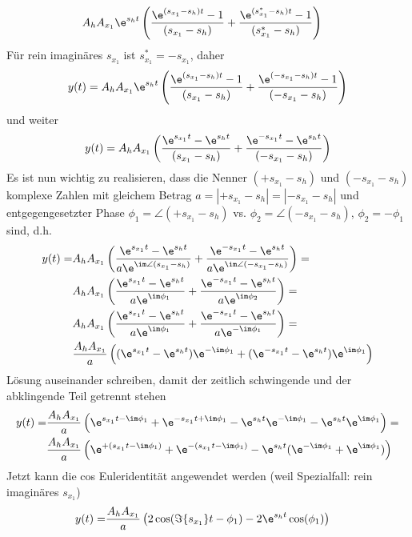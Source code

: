 \begin{ExCalc}
\begin{align}
&A_h A_{x_{1}} \e^{s_h t}  \left(\frac{\e^{(s_{x_{1}}-s_h) t}-1}{(s_{x_{1}}-s_h)}+\frac{\e^{(s^*_{x_{1}}-s_h) t}-1}{(s^*_{x_{1}}-s_h)}\right)
\end{align}
Für rein imaginäres $s_{x_{1}}$ ist $s^*_{x_{1}} = -s_{x_{1}}$, daher
\begin{align}
y(t) = A_h A_{x_{1}} \e^{s_h t}  \left(\frac{\e^{(s_{x_{1}}-s_h) t}-1}{(s_{x_{1}}-s_h)}+\frac{\e^{(-s_{x_{1}}-s_h) t}-1}{(-s_{x_{1}}-s_h)}\right)
\end{align}
und weiter
\begin{align}
y(t) = A_h A_{x_{1}} \left(\frac{\e^{s_{x_{1}} t}-\e^{s_h t}}{(s_{x_{1}}-s_h)}+\frac{\e^{-s_{x_{1}} t}-\e^{s_h t}}{(-s_{x_{1}}-s_h)}\right)
\end{align}
%
Es ist nun wichtig zu realisieren, dass die Nenner
$(+s_{x_{1}}-s_h)$ und $(-s_{x_{1}}-s_h)$ komplexe Zahlen mit gleichem Betrag $a = |+s_{x_{1}}-s_h| = |-s_{x_{1}}-s_h|$ und entgegengesetzter Phase
$\phi_1 = \angle (+s_{x_{1}}-s_h)$ vs. $\phi_2 = \angle (-s_{x_{1}}-s_h)$, $\phi_2 = -\phi_1$ sind, d.h.
%
\begin{align}
y(t) =& A_h A_{x_{1}} \left(\frac{\e^{s_{x_{1}} t}-\e^{s_h t}}{a \e^{\im\angle(s_{x_{1}}-s_h)}}+\frac{\e^{-s_{x_{1}} t}-\e^{s_h t}}{a \e^{\im\angle(-s_{x_{1}}-s_h)}}\right)=\\
& A_h A_{x_{1}} \left(\frac{\e^{s_{x_{1}} t}-\e^{s_h t}}{a \e^{\im\phi_1}}+\frac{\e^{-s_{x_{1}} t}-\e^{s_h t}}{a \e^{\im\phi_2}}\right)=\\
& A_h A_{x_{1}} \left(\frac{\e^{s_{x_{1}} t}-\e^{s_h t}}{a \e^{\im\phi_1}}+\frac{\e^{-s_{x_{1}} t}-\e^{s_h t}}{a \e^{-\im\phi_1}}\right)=\\
& \frac{A_h A_{x_{1}}}{a} \left((\e^{s_{x_{1}} t}-\e^{s_h t})\e^{-\im\phi_1}+(\e^{-s_{x_{1}} t}-\e^{s_h t})\e^{\im\phi_1}\right)
\end{align}
Lösung auseinander schreiben, damit der zeitlich schwingende und der abklingende Teil getrennt stehen
\begin{align}
y(t) =& \frac{A_h A_{x_{1}}}{a} \left(\e^{s_{x_{1}} t-\im\phi_1}+\e^{-s_{x_{1}} t+\im\phi_1}-\e^{s_h t}\e^{-\im\phi_1}-\e^{s_h t}\e^{\im\phi_1}\right)=\\
& \frac{A_h A_{x_{1}}}{a} \left(\e^{+(s_{x_{1}} t-\im\phi_1)}+\e^{-(s_{x_{1}} t-\im\phi_1)}-\e^{s_h t}(\e^{-\im\phi_1}+\e^{\im\phi_1})\right)
\end{align}
Jetzt kann die cos Euleridentität angewendet werden (weil Spezialfall: rein imaginäres $s_{x_{1}}$)
\begin{align}
y(t) = & \frac{A_h A_{x_{1}}}{a} \left(2\cos(\Im\{s_{x_{1}}\} t-\phi_1)-2\e^{s_h t}\cos(\phi_1)\right)

\end{align}
\end{ExCalc}
